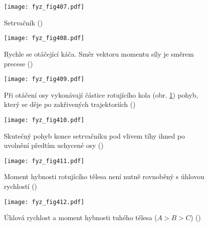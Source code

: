 {  \begin{figure}[ht!] %
    \centering
    \texttt{[image: fyz\_fig407.pdf]}
    \caption{Setrvačník
             (\cite[s.~279]{Feynman01})}
    \label{fyz_fig407}
  \end{figure}

  \begin{figure}[ht!] %
    \centering
    \texttt{[image: fyz\_fig408.pdf]}
    \caption{Rychle se otáčející káča. Směr vektoru momentu síly je směrem precese 
             (\cite[s.~280]{Feynman01})}
    \label{fyz_fig408}
  \end{figure}

  \begin{figure}[ht!] %
    \centering
    \texttt{[image: fyz\_fig409.pdf]}
    \caption{Při otáčení osy vykonávají částice rotujícího kola (obr. \ref{fyz_fig407}) pohyb, 
             který se děje po zakřivených trajektoriích 
             (\cite[s.~280]{Feynman01})}
    \label{fyz_fig409}
  \end{figure}

  \begin{figure}[ht!] %
    \centering
    \texttt{[image: fyz\_fig410.pdf]}
    \caption{Skutečný pohyb konce setrvačníku pod vlivem tíhy ihned po uvolnění předtím uchycené osy
             (\cite[s.~281]{Feynman01})}
    \label{fyz_fig410}
  \end{figure}

  \begin{figure}[ht!] %
    \centering
    \texttt{[image: fyz\_fig411.pdf]}
    \caption{Moment hybnosti rotujícího tělesa není nutně rovnoběný s úhlovou rychlostí
             (\cite[s.~282]{Feynman01})}
    \label{fyz_fig411}
  \end{figure}

  \begin{figure}[ht!] %
    \centering
    \texttt{[image: fyz\_fig412.pdf]}
    \caption{Úhlová rychlost a moment hybnosti tuhého tělesa (\(A>B>C\))
             (\cite[s.~283]{Feynman01})}
    \label{fyz_fig412}
  \end{figure}
  
} %
\printbibliography[title={Seznam literatury}, heading=subbibliography]
